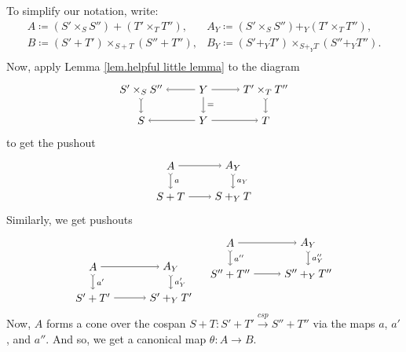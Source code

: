 \documentclass{tac}
\newcommand{\from}{\colon}
\newcommand{\cospan}{\xrightarrow{\mathit{csp}}}
\begin{document}
To simplify our notation, write:
	\[\begin{array}{ll}
		 A  \coloneqq ( S' \times_S S'' ) + ( T' \times_T T'' ), &
		 A_Y  \coloneqq ( S' \times_S S'' ) +_Y ( T' \times_T T'' ) , \\
		 B  \coloneqq ( S' + T' ) \times_{ S + T } ( S'' + T'' ),  &
		 B_Y  \coloneqq ( S' +_Y T' ) \times_{ S +_Y T } ( S'' +_Y T'' ).   \\
	\end{array}\]
Now, apply Lemma \ref{lem.helpful little lemma} to the diagram
\[ 
	\begin{tikzpicture}
	\node (B) at (-2,1) {$S'\times_SS''$};
	\node (A) at (0,1) {$Y$};
	\node (C) at (2,1) {$T'\times_TT''$};
	\node (B') at (-2,0) {$S$};
	\node (A') at (0,0) {$Y$};
	\node (C') at (2,0) {$T$};
	\draw [->] (A) edge (B);
	\draw [font=\scriptsize,->] (A) edge node[right] {$=$} (A');
	\draw [->] (A) edge (C);
	\draw [->] (A') edge (B');
	\draw [->] (A') edge (C');
	\draw [>->] (B) edge (B');
	\draw [>->] (C) edge (C');
	\end{tikzpicture}
\]
to get the pushout
\[
	\begin{tikzpicture}
	\node (BC) at (0,1) {$A$};
	\node (BAC) at (2,1) {$A_Y$};
	\node (BC') at (0,0) {$S+T$};
	\node (BAC') at (2,0) {$S+_YT$};
	\draw [->] (BC) edge (BAC);
	\draw [font=\scriptsize,>->] (BC) edge node[right] {$a$} (BC');
	\draw [font=\scriptsize,>->] (BAC) edge node[right] {$a_Y$} (BAC');
	\draw [->] (BC') edge (BAC');
	\end{tikzpicture}
\]
Similarly, we get pushouts
\[
	\begin{tikzpicture}[baseline=(current  bounding  box.center)]
	\node (BC) at (0,1) {$A$};
	\node (BAC) at (2.5,1) {$A_Y$};
	\node (BC') at (0,0) {$S'+T'$};
	\node (BAC') at (2.5,0) {$S'+_YT'$};
	\draw [->] (BC) edge (BAC);
	\draw [font=\scriptsize,>->] (BC) edge node[right] {$a'$} (BC');
	\draw [font=\scriptsize,>->] (BAC) edge node[right] {$a'_Y$} (BAC');
	\draw [->] (BC') edge (BAC');
	\end{tikzpicture}
	\quad
	\begin{tikzpicture}
	\node (BC) at (0,1) {$A$};
	\node (BAC) at (2.5,1) {$A_Y$};
	\node (BC') at (0,0) {$S''+T''$};
	\node (BAC') at (2.5,0) {$S''+_YT''$};
	\draw [->] (BC) edge (BAC);
	\draw [font=\scriptsize,>->] (BC) edge node[right] {$a''$} (BC');
	\draw [font=\scriptsize,>->] (BAC) edge node[right] {$a''_Y$} (BAC');
	\draw [->] (BC') edge (BAC');
	\end{tikzpicture}
\]
Now, $A$  forms a cone over the cospan 
	$ S + T \from S' + T' \cospan S'' + T''$ 
via the maps $ a $, $ a' $, and $ a'' $. 
And so, we get a canonical map 
	$ \theta \from A \to B $.  
\end{document}
